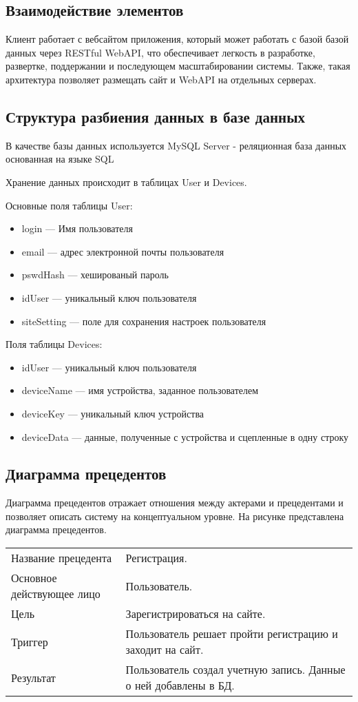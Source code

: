 \subsection{Взаимодействие элементов}
Клиент работает с вебсайтом приложения, который может работать с базой базой данных
через RESTful WebAPI, что обеспечивает легкость в разработке, развертке, поддержании и
последующем масштабировании системы. Также, такая архитектура позволяет размещать сайт
и WebAPI на отдельных серверах.

\subsection{Структура разбиения данных в базе данных}
В качестве базы данных используется MySQL Server - реляционная база данных основанная на 
языке SQL\par
Хранение данных происходит в таблицах User и Devices.\par
Основные поля таблицы User:
\begin{itemize}
    \item login --- Имя пользователя
    \item email --- адрес электронной почты пользователя
    \item pswdHash --- хешированый пароль
    \item idUser --- уникальный ключ пользователя
    \item siteSetting --- поле для сохранения настроек пользователя
\end{itemize}
Поля таблицы Devices:
\begin{itemize}
    \item idUser --- уникальный ключ пользователя
    \item deviceName --- имя устройства, заданное пользователем
    \item deviceKey --- уникальный ключ устройства
    \item deviceData --- данные, полученные с устройства и сцепленные в одну строку
\end{itemize}

\subsection{Диаграмма прецедентов}
Диаграмма прецедентов отражает отношения между актерами и прецедентами и позволяет 
описать систему на концептуальном уровне. На рисунке представлена диаграмма прецедентов.

\begin{table}[]
    \begin{tabular}{ll}
    Название прецедента       & Регистрация.\\
    Основное действующее лицо & Пользователь.\\
    Цель                      & Зарегистрироваться на сайте.\\
    Триггер                   & Пользователь решает пройти регистрацию и заходит на сайт.\\
    Результат                 & Пользователь создал учетную запись. Данные о ней добавлены в БД.
    \end{tabular}
\end{table}

